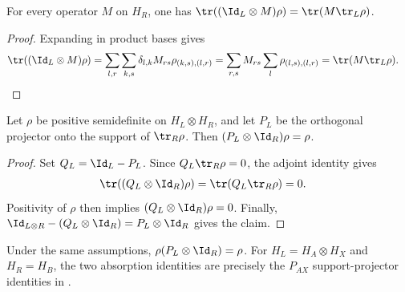 \begin{lemma}
    \label{lem:trace_lift_right_factor_mul}
    \leanok
    For every operator $M$ on $H_R$, one has
    $\tr((\Id_L\otimes M)\rho)=\tr(M\tr_L\rho)$.
\end{lemma}

\begin{proof}
    \leanok
    Expanding in product bases gives
    \begin{align}
        \tr((\Id_L\otimes M)\rho)
        &=\sum_{l,r}\sum_{k,s}\delta_{l,k}M_{rs}
          \rho_{(k,s),(l,r)} =\sum_{r,s}M_{rs}\sum_l\rho_{(l,s),(l,r)} =\tr(M\tr_L\rho).
        \notag
    \end{align}
\end{proof}

\begin{theorem}
    \label{thm:marginal_support_left_absorption}
    \leanok
    Let $\rho$ be positive semidefinite on $H_L\otimes H_R$, and let $P_L$ be
    the orthogonal projector onto the support of $\tr_R\rho$. Then
    $(P_L\otimes\Id_R)\rho=\rho$.
\end{theorem}

\begin{proof}
    \leanok
    Set $Q_L=\Id_L-P_L$. Since $Q_L\tr_R\rho=0$, the adjoint identity gives
    \begin{align}
        \tr((Q_L\otimes\Id_R)\rho)
        &=\tr(Q_L\tr_R\rho) =0.
        \notag
    \end{align}
    Positivity of $\rho$ then implies
    $(Q_L\otimes\Id_R)\rho=0$. Finally,
    $\Id_{L\otimes R}-(Q_L\otimes\Id_R)=P_L\otimes\Id_R$ gives the claim.
\end{proof}

\begin{theorem}
    \label{thm:marginal_support_right_absorption}
    \leanok
    Under the same assumptions,
    $\rho(P_L\otimes\Id_R)=\rho$.
    For $H_L=H_A\otimes H_X$ and $H_R=H_B$, the two absorption identities are
    precisely the $P_{AX}$ support-projector identities in
    \cite[Appendix~D.2, lines 2228--2235]{Cirac2016MPDO_arXiv}.
\end{theorem}

